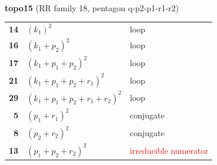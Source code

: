 \documentclass[10pt]{article}
\begin{document}
\begin{minipage}[t]{0.48\textwidth}
{}\\[2mm]\textbf{topo15} (RR family 18, pentagon q-p2-p1-r1-r2)\\[2pt]{\footnotesize\begin{tabular}{@{}r@{\ \ }l@{\ \ }l@{}}\textbf{14} & $(k_1)^2$ & loop\\
\textbf{16} & $(k_1+p_2)^2$ & loop\\
\textbf{17} & $(k_1+p_1+p_2)^2$ & loop\\
\textbf{21} & $(k_1+p_1+p_2+r_1)^2$ & loop\\
\textbf{29} & $(k_1+p_1+p_2+r_1+r_2)^2$ & loop\\
\textbf{5} & $(p_1+r_1)^2$ & conjugate\\
\textbf{8} & $(p_2+r_2)^2$ & conjugate\\
\textbf{13} & $(p_1+p_2+r_2)^2$ & \textcolor{red}{irreducible numerator}\\\end{tabular}}\end{minipage}\hfill%
\end{document}
